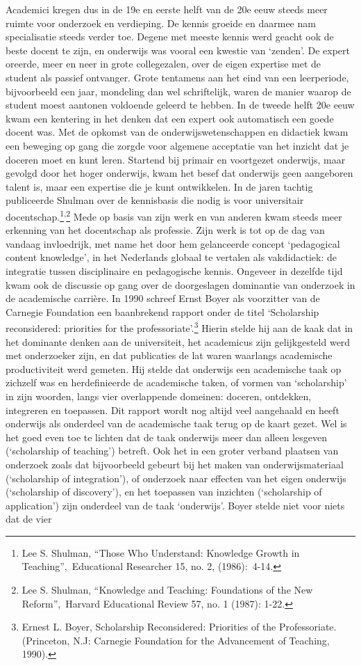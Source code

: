 \documentclass[empirical, authordate, ]{new-jote-article}
\begin{document}
	Academici kregen dus in de 19e en eerste helft van de 20e eeuw steeds meer ruimte voor onderzoek en verdieping. De kennis groeide en daarmee nam specialisatie steeds verder toe. Degene met meeste kennis werd geacht ook de beste docent te zijn, en onderwijs was vooral een kwestie van ‘zenden'. De expert oreerde, meer en neer in grote collegezalen, over de eigen expertise met de student als passief ontvanger. Grote tentamens aan het eind van een leerperiode, bijvoorbeeld een jaar, mondeling dan wel schriftelijk, waren de manier waarop de student moest aantonen voldoende geleerd te hebben. In de tweede helft 20e eeuw kwam een kentering in het denken dat een expert ook automatisch een goede docent was. Met de opkomst van de onderwijswetenschappen en didactiek kwam een beweging op gang die zorgde voor algemene acceptatie van het inzicht dat je doceren moet en kunt leren. Startend bij primair en voortgezet onderwijs, maar gevolgd door het hoger onderwijs, kwam het besef dat onderwijs geen aangeboren talent is, maar een expertise die je kunt ontwikkelen. In de jaren tachtig publiceerde Shulman over de kennisbasis die nodig is voor universitair docentschap.\footnote{Lee S. Shulman, “Those Who Understand: Knowledge Growth in Teaching”, Educational Researcher 15, no. 2, (1986): 4-14.}\textsuperscript{,}\footnote{Lee S. Shulman, “Knowledge and Teaching: Foundations of the New Reform”, Harvard Educational Review 57, no. 1 (1987): 1-22.} Mede op basis van zijn werk en van anderen kwam steeds meer erkenning van het docentschap als professie. Zijn werk is tot op de dag van vandaag invloedrijk, met name het door hem gelanceerde concept ‘pedagogical content knowledge', in het Nederlands globaal te vertalen als vakdidactiek: de integratie tussen disciplinaire en pedagogische kennis. Ongeveer in dezelfde tijd kwam ook de discussie op gang over de doorgeslagen dominantie van onderzoek in de academische carrière. In 1990 schreef Ernst Boyer als voorzitter van de Carnegie Foundation een baanbrekend rapport onder de titel ‘Scholarship reconsidered: priorities for the professoriate'.\footnote{Ernest L. Boyer, Scholarship Reconsidered: Priorities of the Professoriate. (Princeton, N.J: Carnegie Foundation for the Advancement of Teaching, 1990). } Hierin stelde hij aan de kaak dat in het dominante denken aan de universiteit, het academicus zijn gelijkgesteld werd met onderzoeker zijn, en dat publicaties de lat waren waarlangs academische productiviteit werd gemeten. Hij stelde dat onderwijs een academische taak op zichzelf was en herdefinieerde de academische taken, of vormen van ‘scholarship' in zijn woorden, langs vier overlappende domeinen: doceren, ontdekken, integreren en toepassen. Dit rapport wordt nog altijd veel aangehaald en heeft onderwijs als onderdeel van de academische taak terug op de kaart gezet. Wel is het goed even toe te lichten dat de taak onderwijs meer dan alleen lesgeven (‘scholarship of teaching') betreft. Ook het in een groter verband plaatsen van onderzoek zoals dat bijvoorbeeld gebeurt bij het maken van onderwijsmateriaal (‘scholarship of integration'), of onderzoek naar effecten van het eigen onderwijs (‘scholarship of discovery'), en het toepassen van inzichten (‘scholarship of application') zijn onderdeel van de taak ‘onderwijs'. Boyer stelde niet voor niets dat de vier 
\end{document}
